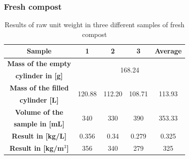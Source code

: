 \documentclass{article}
\begin{document}
\subsubsection{Fresh compost}
\renewcommand{\arraystretch}{1.5}
\begin{table}[ht!]
    \centering \vspace{.3cm}
    \caption{Results of raw unit weight in three different samples of fresh compost}
    \begin{tabular}{|c|c|c|c|c|}
        \hline
        \textbf{Sample} & \textbf{1} & \textbf{2} & \textbf{3} & \textbf{Average}\\
        \hline
        {\textbf{Mass of the empty}} & \multicolumn{4}{c|}{\multirow{2}{*}{168.24}}\\
        \textbf{cylinder in [g]} & \multicolumn{4}{c|}{}\\
        \hline
        \textbf{Mass of the filled} & \multirow{2}{*}{120.88} & \multirow{2}{*}{112.20} & \multirow{2}{*}{108.71} & \multirow{2}{*}{113.93}\\
        \textbf{cylinder [L]} & & & &\\
        \hline
        \textbf{Volume of the} & \multirow{2}{*}{340} & \multirow{2}{*}{330} & \multirow{2}{*}{390} & \multirow{2}{*}{353.33}\\
        \textbf{sample in [mL]} & & & &\\
        \hline
        \textbf{Result in [kg/L]} & 0.356 & 0.34 & 0.279 & 0.325\\
        \hline
        \textbf{Result in [kg/m$^3$]} & 356 & 340 & 279 & 325\\
        \hline
    \end{tabular}
\end{table}

\newpage
\end{document}
